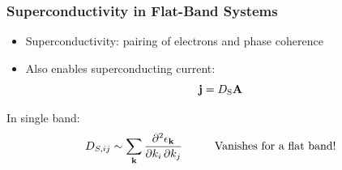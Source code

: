 \documentclass[aspectratio=169]{beamer}
\begin{document}

\begin{frame}
	\frametitle{Superconductivity in Flat-Band Systems}
	
	\begin{itemize}
		\item Superconductivity: pairing of electrons and phase coherence
		\item Also enables superconducting current:
		\begin{equation}
			\mathbf{j} = D_{\mathrm{S}} \mathbf{A}
		\end{equation}
	\end{itemize}
	In single band:
	\begin{equation}
		D_{S, ij} \sim \sum_{\mathbf{k}} \pdv{\epsilon_{\mathbf{k}}}{k_i,k_j} \hspace{1cm} \text{Vanishes for a flat band!}
	\end{equation}
\end{frame}
\end{document}
